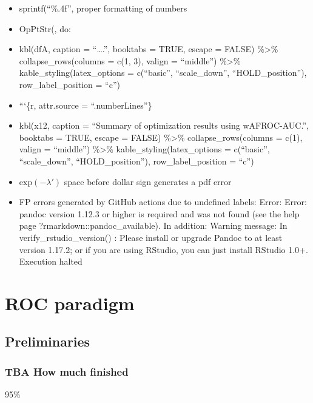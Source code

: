 \documentclass[
]{book}
\providecommand{\tightlist}{%
  \setlength{\itemsep}{0pt}\setlength{\parskip}{0pt}}
\begin{document}
\begin{itemize}
\tightlist
\item
  sprintf(``\%.4f'', proper formatting of numbers
\item
  OpPtStr(, do:
\item
  kbl(dfA, caption = ``\ldots.'', booktabs = TRUE, escape = FALSE) \%\textgreater\% collapse\_rows(columns = c(1, 3), valign = ``middle'') \%\textgreater\% kable\_styling(latex\_options = c(``basic'', ``scale\_down'', ``HOLD\_position''), row\_label\_position = ``c'')
\item
  ```\{r, attr.source = ``.numberLines''\}
\item
  kbl(x12, caption = ``Summary of optimization results using wAFROC-AUC.'', booktabs = TRUE, escape = FALSE) \%\textgreater\% collapse\_rows(columns = c(1), valign = ``middle'') \%\textgreater\% kable\_styling(latex\_options = c(``basic'', ``scale\_down'', ``HOLD\_position''), row\_label\_position = ``c'')
\item
  \(\text{exp} \left ( -\lambda' \right )\) space before dollar sign generates a pdf error
\item
  FP errors generated by GitHub actions due to undefined labels:
  Error: Error: pandoc version 1.12.3 or higher is required and was not found (see the help page ?rmarkdown::pandoc\_available).
  In addition: Warning message:
  In verify\_rstudio\_version() :
  Please install or upgrade Pandoc to at least version 1.17.2; or if you are using RStudio, you can just install RStudio 1.0+.
  Execution halted
\end{itemize}

\hypertarget{part-roc-paradigm}{%
\part*{ROC paradigm}\label{part-roc-paradigm}}

\hypertarget{preliminaries}{%
\chapter{Preliminaries}\label{preliminaries}}

\hypertarget{preliminaries-how-much-finished}{%
\section{TBA How much finished}\label{preliminaries-how-much-finished}}

95\%
\end{document}
